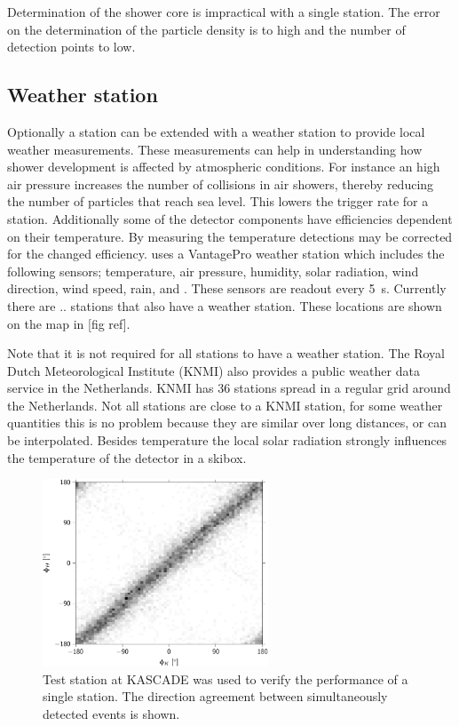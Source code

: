 Determination of the shower core is impractical with a single station. The error on the determination of the particle density is to high and the number of detection points to low.

\subsection{Weather station}

Optionally a \hisparc station can be extended with a weather station to provide local weather measurements. These measurements can help in understanding how shower development is affected by atmospheric conditions. For instance an high air pressure increases the number of collisions in air showers, thereby reducing the number of particles that reach sea level. This lowers the trigger rate for a station. Additionally some of the detector components have efficiencies dependent on their temperature. By measuring the temperature detections may be corrected for the changed efficiency. \hisparc uses a VantagePro weather station which includes the following sensors; temperature, air pressure, humidity, solar radiation, wind direction, wind speed, rain, and . These sensors are readout every \SI{5}{\second}. Currently there are .. \hisparc stations that also have a weather station. These locations are shown on the map in [fig ref].

Note that it is not required for all stations to have a weather station. The Royal Dutch Meteorological Institute (KNMI) also provides a public weather data service in the Netherlands. KNMI has 36 stations spread in a regular grid around the Netherlands. Not all \hisparc stations are close to a KNMI station, for some weather quantities this is no problem because they are similar over long distances, or can be interpolated. Besides temperature the local solar radiation strongly influences the temperature of the detector in a skibox.

\begin{figure}
    \centering
    \includegraphics[width=0.6\textwidth]
                    {plots/experiment/azimuth_kascade_minn1}
    \caption{Test station at KASCADE was used to verify the performance of a single station. The direction agreement between simultaneously detected events is shown.}
    \label{fig:azimuth_kascade_minn1}
\end{figure}


